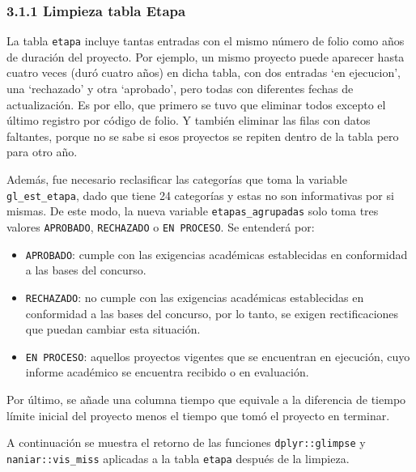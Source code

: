 \documentclass[
]{article}
\providecommand{\tightlist}{%
  \setlength{\itemsep}{0pt}\setlength{\parskip}{0pt}}
\begin{document}
\hypertarget{limpieza-tabla-etapa}{%
\subsubsection{3.1.1 Limpieza tabla Etapa}\label{limpieza-tabla-etapa}}

La tabla \texttt{etapa} incluye tantas entradas con el mismo número de
folio como años de duración del proyecto. Por ejemplo, un mismo proyecto
puede aparecer hasta cuatro veces (duró cuatro años) en dicha tabla, con
dos entradas `en ejecucion', una `rechazado' y otra `aprobado', pero
todas con diferentes fechas de actualización. Es por ello, que primero
se tuvo que eliminar todos excepto el último registro por código de
folio. Y también eliminar las filas con datos faltantes, porque no se
sabe si esos proyectos se repiten dentro de la tabla pero para otro año.

Además, fue necesario reclasificar las categorías que toma la variable
\texttt{gl\_est\_etapa}, dado que tiene 24 categorías y estas no son
informativas por si mismas. De este modo, la nueva variable
\texttt{etapas\_agrupadas} solo toma tres valores \texttt{APROBADO},
\texttt{RECHAZADO} o \texttt{EN\ PROCESO}. Se entenderá por:

\begin{itemize}
\tightlist
\item
  \texttt{APROBADO}: cumple con las exigencias académicas establecidas
  en conformidad a las bases del concurso.
\item
  \texttt{RECHAZADO}: no cumple con las exigencias académicas
  establecidas en conformidad a las bases del concurso, por lo tanto, se
  exigen rectificaciones que puedan cambiar esta situación.
\item
  \texttt{EN\ PROCESO}: aquellos proyectos vigentes que se encuentran en
  ejecución, cuyo informe académico se encuentra recibido o en
  evaluación.
\end{itemize}

Por último, se añade una columna tiempo que equivale a la diferencia de
tiempo límite inicial del proyecto menos el tiempo que tomó el proyecto
en terminar.

A continuación se muestra el retorno de las funciones
\texttt{dplyr::glimpse} y \texttt{naniar::vis\_miss} aplicadas a la
tabla \texttt{etapa} después de la limpieza.
\end{document}
